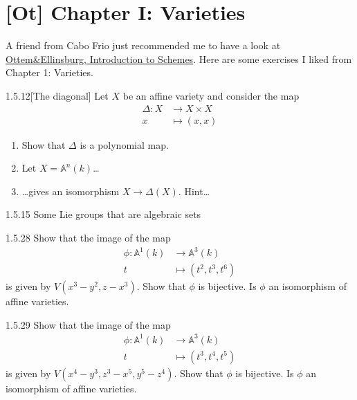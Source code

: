 \section{[Ot] Chapter I: Varieties}

A friend from Cabo Frio just recommended me to have a look at \href{https://www.uio.no/studier/emner/matnat/math/MAT4215/data/masteragbook.pdf}{Ottem\&Ellinsburg, Introduction to Schemes}. Here are some exercises I liked from Chapter 1: Varieties.

\begin{manualexercise}{1.5.12}[The diagonal]
	Let $X$ be an affine variety and consider the map
	\begin{align*}
		\Delta: X &\longrightarrow X\times X \\
		x &\longmapsto (x,x)
	\end{align*}
	\begin{enumerate}[label=\alph*.]
		\item Show that $\Delta$ is a polynomial map.
		\item Let $X=\mathbb{A}^{n}(k)$…
		\item …gives an isomorphism $X\to \Delta(X)$. Hint…
	\end{enumerate}
\end{manualexercise}

\begin{manualexercise}{1.5.15}
{\color{magenta}Some Lie groups that are algebraic sets}
\end{manualexercise}

\begin{manualexercise}{1.5.28}
	Show that the image of the map
	\begin{align*}
		\phi: \mathbb{A}^{1}(k) &\longrightarrow \mathbb{A}^{3}(k) \\
		t &\longmapsto (t^{2},t^{3},t^{6})
	\end{align*}
	is given by $V(x^{3}-y^{2},z-x^{3})$. Show that $\phi$ is bijective. Is $\phi$ an isomorphism of affine varieties.
\end{manualexercise}

\begin{manualexercise}{1.5.29}
	Show that the image of the map
	\begin{align*}
		\phi: \mathbb{A}^{1}(k) &\longrightarrow \mathbb{A}^{3}(k) \\
		t &\longmapsto (t^{3},t^{4},t^{5})
	\end{align*}
	is given by $V(x^{4}-y^{3},z^{3}-x^{5},y^{5}-z^{4})$. Show that $\phi$ is bijective. Is $\phi$ an isomorphism of affine varieties.
\end{manualexercise}

